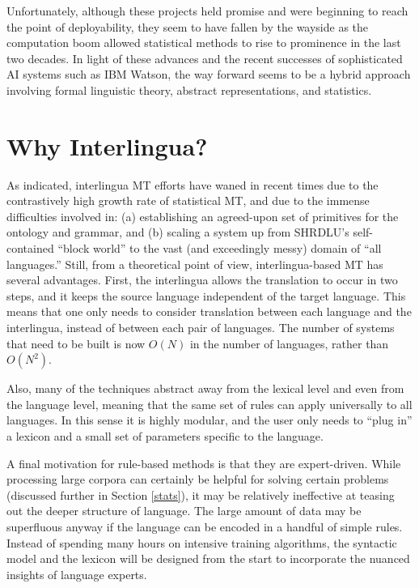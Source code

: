 \documentclass[11pt, oneside]{article}      %
\begin{document}
Unfortunately, although these projects held promise and were beginning to reach the point of deployability, they seem to have fallen by the wayside as the computation boom allowed statistical methods to rise to prominence in the last two decades.  In light of these advances and the recent successes of sophisticated AI systems such as IBM Watson, the way forward seems to be a hybrid approach involving formal linguistic theory, abstract representations, and statistics.

\section{Why Interlingua?}

As indicated, interlingua MT efforts have waned in recent times due to the contrastively high growth rate of statistical MT, and due to the immense difficulties involved in: (a) establishing an agreed-upon set of primitives for the ontology and grammar, and (b) scaling a system up from SHRDLU's self-contained ``block world'' to the vast (and exceedingly messy) domain of ``all languages.''  Still, from a theoretical point of view, interlingua-based MT has several advantages.  First, the interlingua allows the translation to occur in two steps, and it keeps the source language independent of the target language.  This means that one only needs to consider translation between each language and the interlingua, instead of between each pair of languages.  The number of systems that need to be built is now $O(N)$ in the number of languages, rather than $O(N^2)$.

Also, many of the techniques abstract away from the lexical level and even from the language level, meaning that the same set of rules can apply universally to all languages.  In this sense it is highly modular, and the user only needs to ``plug in'' a lexicon and a small set of parameters specific to the language.

A final motivation for rule-based methods is that they are expert-driven.  While processing large corpora can certainly be helpful for solving certain problems (discussed further in Section \ref{stats}), it may be relatively ineffective at teasing out the deeper structure of language.  The large amount of data may be superfluous anyway if the language can be encoded in a handful of simple rules.  Instead of spending many hours on intensive training algorithms, the syntactic model and the lexicon will be designed from the start to incorporate the nuanced insights of language experts.  
\end{document}
